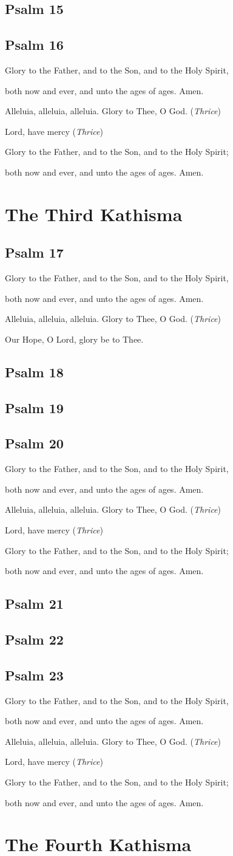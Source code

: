 \documentclass[12pt,openany]{book}
\newcommand{\kathismabreak}{
  \medskip
  \begin{center}
  \begin{footnotesize}
  Glory to the Father, and to the Son, and to the Holy Spirit,
  
  both now and ever, and unto the ages of ages. Amen.

  Alleluia, alleluia, alleluia. Glory to Thee, O God. (\textit{Thrice})

  Lord, have mercy (\textit{Thrice})

  Glory to the Father, and to the Son, and to the Holy Spirit;
  
  both now and ever, and unto the ages of ages. Amen.
  \end{footnotesize}
  \end{center}
  \smallbreak
}
\newcommand{\kathismaend}{
  \medskip
  \begin{center}
  \begin{footnotesize}
  Glory to the Father, and to the Son, and to the Holy Spirit,
  
  both now and ever, and unto the ages of ages. Amen.

  Alleluia, alleluia, alleluia. Glory to Thee, O God. (\textit{Thrice})

  Our Hope, O Lord, glory be to Thee.
  \end{footnotesize}
  \end{center}
  \smallbreak
}
\begin{document}
\section{Psalm 15}

\smallskip
\section{Psalm 16}


\kathismabreak

\chapter*{The Third Kathisma}
\smallskip
\section{Psalm 17}


\kathismaend
\smallskip
\section{Psalm 18}

\smallskip

\section{Psalm 19}

\smallskip
\section{Psalm 20}


\kathismabreak
\smallskip
\section{Psalm 21}

\smallskip
\section{Psalm 22}

\smallskip
\section{Psalm 23}


\kathismabreak

\chapter*{The Fourth Kathisma}
\smallskip
\end{document}
